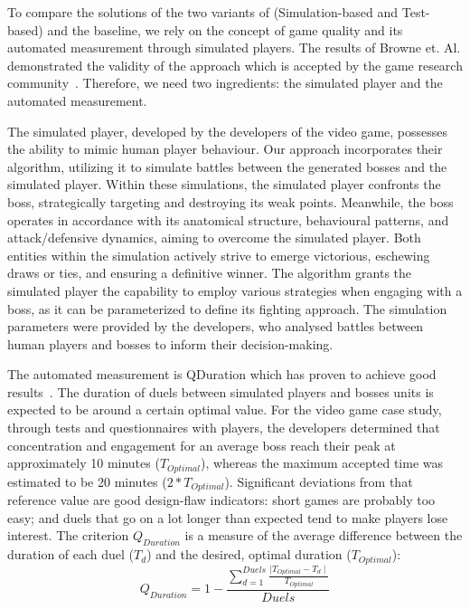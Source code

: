 To compare the solutions of the two variants of \ApproachName{} (Simulation-based and Test-based) and the baseline, we rely on the concept of game quality and its automated measurement through simulated players. The results of Browne et. Al. demonstrated the validity of the approach which is accepted by the game research community~\cite{browne2010evolutionary}. Therefore, we need two ingredients: the simulated player and the automated measurement.

The simulated player, developed by the developers of the \CaseStudy{} video game, possesses the ability to mimic human player behaviour. Our approach incorporates their algorithm, utilizing it to simulate battles between the generated bosses and the simulated player. Within these simulations, the simulated player confronts the boss, strategically targeting and destroying its weak points. Meanwhile, the boss operates in accordance with its anatomical structure, behavioural patterns, and attack/defensive dynamics, aiming to overcome the simulated player. Both entities within the simulation actively strive to emerge victorious, eschewing draws or ties, and ensuring a definitive winner. The algorithm grants the simulated player the capability to employ various strategies when engaging with a boss, as it can be parameterized to define its fighting approach. The simulation parameters were provided by the developers, who analysed battles between human players and bosses to inform their decision-making.

The automated measurement is QDuration which has proven to achieve good results~\cite{browne2010evolutionary}. The duration of duels between simulated players and bosses units is expected to be around a certain optimal value. For the video game case study, through tests and questionnaires with players, the developers determined that concentration and engagement for an average boss reach their peak at approximately 10 minutes ($T_{Optimal}$), whereas the maximum accepted time was estimated to be 20 minutes ($2*T_{Optimal}$). Significant deviations from that reference value are good design-flaw indicators: short games are probably too easy; and duels that go on a lot longer than expected tend to make players lose interest. The criterion $Q_{Duration}$ is a measure of the average difference between the duration of each duel ($T_{d}$) and the desired, optimal duration ($T_{Optimal}$):
\begin{equation}
Q_{Duration} =  1 - \frac{\sum\limits_{d=1}^{Duels}\frac{\mid T_{Optimal} - T_{d} \mid}{T_{Optimal}}}{Duels} 
\end{equation}


